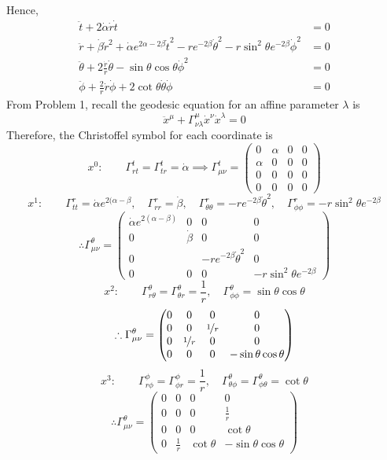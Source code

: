\documentclass{article}
\begin{document}
			Hence,
			\begin{align*}
				\ddot{t} + 2 \dot{\alpha} \dot{r} \dot{t} &= 0 \\
				\ddot{r} + \dot{\beta} \dot{r}^2 + \dot{\alpha} e^{2\alpha - 2 \beta} \dot{t}^2 - r e^{-2 \beta} \dot{\theta}^2 -  r \sin^2 \theta e^{-2 \beta} \dot{\phi}^2 &= 0  \\
				\ddot{\theta} + 2 \frac{\dot{r}}{r} \dot{\theta} -  \sin \theta \cos \theta \dot{\phi}^2 &= 0 \\
				\ddot{\phi} + \frac{2}{r} \dot{r} \dot{\phi} +  2 \cot{\theta} \dot{\theta} \dot{\phi} &= 0
			\end{align*}
			From Problem 1, recall the geodesic equation for an affine parameter $\lambda$ is
			$$ \ddot{x}^\mu + \Gamma_{\nu \lambda}^\mu \dot{x}^\nu \dot{x}^\lambda = 0$$
			Therefore, the Christoffel symbol for each coordinate is
			$$ x^0: \quad \quad \Gamma_{rt}^t = \Gamma_{tr}^t = \dot{\alpha} \implies \Gamma_{\mu\nu}^t = \begin{pmatrix}
				0 & \alpha & 0 & 0 \\
				\alpha & 0 & 0 & 0 \\
				0 & 0 & 0 & 0 \\
				0 & 0 & 0 & 0
			\end{pmatrix}$$
			$$ x^1: \quad \quad \Gamma_{tt}^r = \dot{\alpha}e^{2(\alpha - \beta}, \quad \Gamma_{rr}^r = \dot{\beta}, \quad \Gamma_{\theta\theta}^r = -re^{-2\beta}\dot{\theta}^2, \quad \Gamma_{\phi\phi}^r = - r\sin^2 \theta e^{-2 \beta} $$
			$$ \therefore \Gamma_{\mu\nu}^{\theta} = 
				\begin{pmatrix}
					\dot{\alpha}e^{2(\alpha - \beta)} & 0 & 0 & 0 \\
					0 & \dot{\beta} & 0 & 0 \\
					0 &  & -re^{-2\beta}\dot{\theta}^2 & 0 \\
					0 & 0 & 0 & - r\sin^2 \theta e^{-2 \beta}
				\end{pmatrix}
				$$
			$$ x^2: \quad \quad \Gamma_{r\theta}^\theta = \Gamma_{\theta r}^\theta = \frac1r, \quad \Gamma_{\phi\phi}^\theta = \sin \theta \cos\theta$$
			$$ \therefore \Gamma_{\mu\nu}^{\theta} = 
			\begin{pmatrix}
				0 & 0 & 0 & 0 \\
				0 & 0 & \nicefrac1r & 0 \\
				0 & \nicefrac1r & 0 & 0 \\
				0 & 0 & 0 & -\sin\theta\cos\theta
			\end{pmatrix}
			$$	
			$$ x^3: \quad \quad \Gamma_{r\phi}^\phi = \Gamma_{\phi r}^\phi = \frac1r, \quad \Gamma_{\theta\phi}^\theta = \Gamma_{\phi\theta}^\theta = \cot \theta$$
			$$ \therefore \Gamma_{\mu\nu}^{\theta} = 
			\begin{pmatrix}
				0 & 0 & 0 & 0 \\
				0 & 0 & 0 & \frac1r \\
				0 & 0 & 0 & \cot\theta \\
				0 & \frac1r & \cot\theta & -\sin\theta\cos\theta
			\end{pmatrix}
			$$	
	\pagebreak
\end{document}
